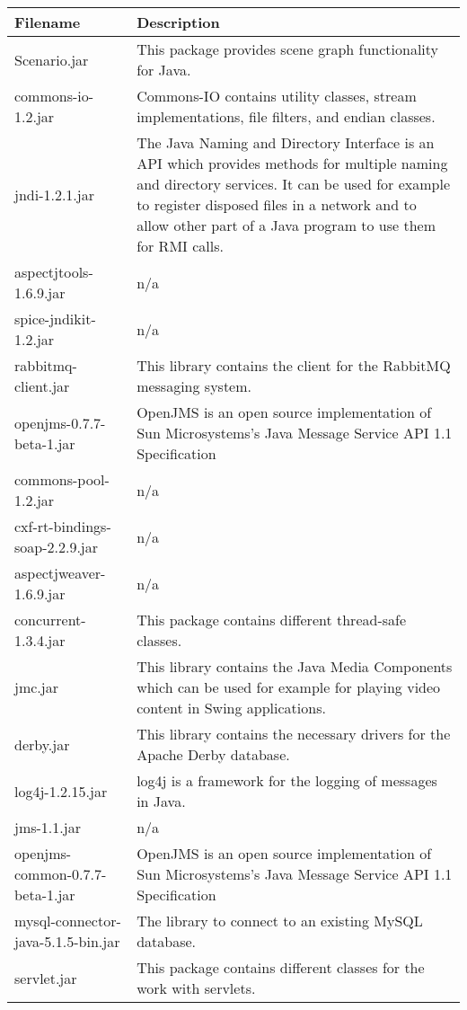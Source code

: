 \begin{center}
\begin{longtable}{|p{}|p{}|}
\hline 
Filename & Description\\
\hline
\hline 
Scenario.jar & This package provides scene graph functionality for Java.\\
\hline 
commons-io-1.2.jar & Commons-IO contains utility classes, stream implementations, file filters, and endian classes.\\
\hline 
jndi-1.2.1.jar & The Java Naming and Directory Interface is an API which provides methods for multiple naming and directory services. It can be used for example to register disposed files in a network and to allow other part of a Java program to use them for RMI calls.\\
\hline 
aspectjtools-1.6.9.jar & n/a\\
\hline 
spice-jndikit-1.2.jar & n/a\\
\hline 
rabbitmq-client.jar & This library contains the client for the RabbitMQ messaging system.\\
\hline 
openjms-0.7.7-beta-1.jar & OpenJMS is an open source implementation of Sun Microsystems's Java Message Service API 1.1 Specification\\
\hline 
commons-pool-1.2.jar & n/a\\
\hline 
cxf-rt-bindings-soap-2.2.9.jar & n/a\\
\hline 
aspectjweaver-1.6.9.jar & n/a\\
\hline 
concurrent-1.3.4.jar & This package contains different thread-safe classes.\\
\hline 
jmc.jar & This library contains the Java Media Components which can be used for example for playing video content in Swing applications.\\
\hline 
derby.jar & This library contains the necessary drivers for the Apache Derby database.\\
\hline 
log4j-1.2.15.jar & log4j is a framework for the logging of messages in Java.\\
\hline 
jms-1.1.jar & n/a\\
\hline 
openjms-common-0.7.7-beta-1.jar & OpenJMS is an open source implementation of Sun Microsystems's Java Message Service API 1.1 Specification\\
\hline 
mysql-connector-java-5.1.5-bin.jar & The library to connect to an existing MySQL database.\\
\hline 
servlet.jar & This package contains different classes for the work with servlets.\\

\end{longtable}
\end{center}
